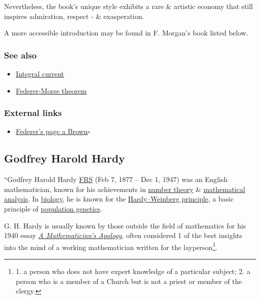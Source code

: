 \documentclass{article}
\begin{document}
Nevertheless, the book's unique style exhibits a rare \& artistic economy that still inspires admiration, respect - \& exasperation.

A more accessible introduction may be found in F. Morgan's book listed below.

\subsubsection{See also}
\begin{itemize}
	\item \href{https://en.wikipedia.org/wiki/Integral_current}{Integral current}
	\item \href{https://en.wikipedia.org/wiki/Federer-Morse_theorem}{Federer-Morse theorem}
\end{itemize}

\subsubsection{External links}
\begin{itemize}
	\item \href{https://web.archive.org/web/20070426204453/http://www.math.brown.edu/faculty/federer.html}{Federer's page a Brown}\hfill$\square$
\end{itemize}


\subsection{Godfrey Harold Hardy}
``{\sc Godfrey Harold Hardy} \href{https://en.wikipedia.org/wiki/Fellow_of_the_Royal_Society}{FRS} (Feb 7, 1877 -- Dec 1, 1947) was an English mathematician, known for his achievements in \href{https://en.wikipedia.org/wiki/Number_theory}{number theory} \& \href{https://en.wikipedia.org/wiki/Mathematical_analysis}{mathematical analysis}. In \href{https://en.wikipedia.org/wiki/Biology}{biology}, he is known for the \href{https://en.wikipedia.org/wiki/Hardy%E2%80%93Weinberg_principle}{Hardy--Weinberg principle}, a basic principle of \href{https://en.wikipedia.org/wiki/Population_genetics}{population genetics}.

{\sc G. H. Hardy} is usually known by those outside the field of mathematics for his 1940 essay \href{https://en.wikipedia.org/wiki/A_Mathematician%27s_Apology}{\it A Mathematician's Apology}, often considered 1 of the best insights into the mind of a working mathematician written for the layperson\footnote{1. a person who does not have expert knowledge of a particular subject; 2. a person who is a member of a Church but is not a priest or member of the clergy.}.
\end{document}
